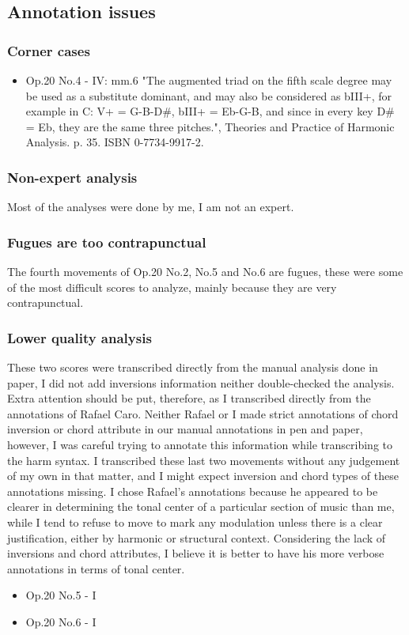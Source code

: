 	\subsection{Annotation issues}
    \subsubsection{Corner cases}
      \begin{itemize}
        \item Op.20 No.4 - IV: mm.6 "The augmented triad on the fifth scale degree may be used as a substitute dominant, and may also be considered as bIII+, for example in C: V+ = G-B-D\#, bIII+ = Eb-G-B, and since in every key D\# = Eb, they are the same three pitches.", Theories and Practice of Harmonic Analysis. p. 35. ISBN 0-7734-9917-2.
      \end{itemize}
		\subsubsection{Non-expert analysis}
    Most of the analyses were done by me, I am not an expert.
		\subsubsection{Fugues are too contrapunctual}
    The fourth movements of Op.20 No.2, No.5 and No.6 are fugues, these were some of the most difficult scores to analyze, mainly because they are very contrapunctual.
		\subsubsection{Lower quality analysis}
    These two scores were transcribed directly from the manual analysis done in paper, I did not add inversions information neither double-checked the analysis. Extra attention should be put, therefore, as I transcribed directly from the annotations of Rafael Caro. Neither Rafael or I made strict annotations of chord inversion or chord attribute in our manual annotations in pen and paper, however, I was careful trying to annotate this information while transcribing to the harm syntax. I transcribed these last two movements without any judgement of my own in that matter, and I might expect inversion and chord types of these annotations missing. I chose Rafael's annotations because he appeared to be clearer in determining the tonal center of a particular section of music than me, while I tend to refuse to move to mark any modulation unless there is a clear justification, either by harmonic or structural context. Considering the lack of inversions and chord attributes, I believe it is better to have his more verbose annotations in terms of tonal center.
    \begin{itemize}
    \item Op.20 No.5 - I
		\item Op.20 No.6 - I
    \end{itemize}
